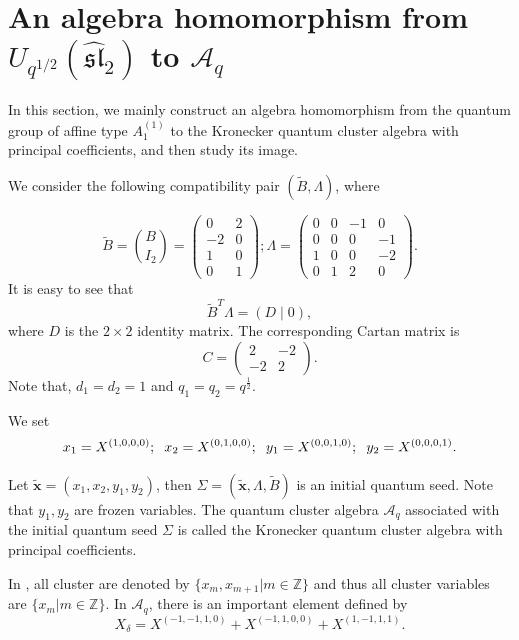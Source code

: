 \documentclass[reqno,11pt]{amsart}
\numberwithin{equation}{section}
\begin{document}
 \section{An algebra homomorphism from  $U_{q^{1/2}}( {\widehat {\mathfrak{sl}}}_2 )$ to $\mathcal A_q$}
In this section, we mainly construct an algebra homomorphism from the  quantum group of affine type $A_1^{(1)}$ to the Kronecker quantum cluster algebra with principal coefficients, and then study its image.

We consider the following compatibility pair $(\widetilde B,\Lambda)$, where

$$\widetilde{B}=\binom{B}{I_2}=\left(\begin{array}{cc}0 & 2 \\ -2 & 0 \\ 1 & 0 \\ 0 & 1\end{array}\right);  \Lambda=\left(\begin{array}{cccc}0 & 0 & -1 & 0 \\ 0 & 0 & 0 & -1 \\ 1 & 0 & 0 & -2 \\ 0 & 1 & 2 & 0\end{array}\right).$$
It is easy to see that
$$\widetilde{B}^T \Lambda=(D \mid 0),$$
where $D$ is the $2\times 2$ identity matrix.
The corresponding Cartan matrix is
$$C=\left(\begin{array}{cc}2 & -2 \\ -2 & 2\end{array}\right).$$
Note that, $d_1 = d_2 = 1$ and $q_1 = q_2 = q^{\frac{1}{2}}$.

We set
$$x_1=X^{(1,0,0,0)};\hspace{0.2cm} x_2=X^{(0,1,0,0)};\hspace{0.2cm} y_1=X^{(0,0,1,0)};\hspace{0.2cm} y_2=X^{(0,0,0,1)}.$$

Let $\widetilde{\mathbf{x}}=\left(x_1, x_2, y_1, y_2\right)$, then $\Sigma=(\widetilde{\mathbf{x}}, \Lambda, \widetilde{B})$ is an initial quantum seed. Note that $y_1, y_2$ are frozen variables. The quantum cluster algebra  $\mathcal A_q$ associated with the initial quantum seed $\Sigma$ is called the Kronecker quantum
cluster algebra with principal coefficients.

In \cite{DXC23}, all cluster are denoted by $\{x_m,x_{m+1}| m \in \mathbb{Z}\}$ and thus all cluster variables are  $\{x_m| m \in \mathbb{Z}\}$.
In $\mathcal A_q$, there is an important  element defined by
$$X_\delta=X^{(-1,-1,1,0)}+X^{(-1,1,0,0)}+X^{(1,-1,1,1)}.$$
\end{document}
